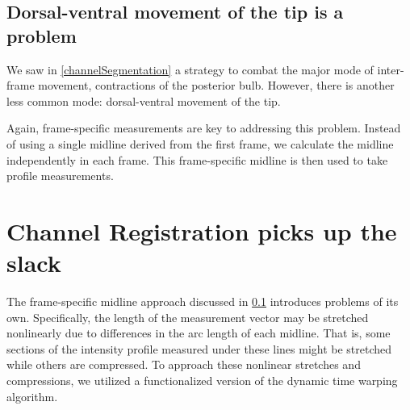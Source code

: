 \subsection{Dorsal-ventral movement of the tip is a problem} \label{frameSpecificMidlines}
We saw in \ref{channelSegmentation} a strategy to combat the major mode of inter-frame movement, contractions of the posterior bulb. However, there is another less common mode: dorsal-ventral movement of the tip. 


Again, frame-specific measurements are key to addressing this problem. Instead of using a single midline derived from the first frame, we calculate the midline independently in each frame. This frame-specific midline is then used to take profile measurements.

\section{Channel Registration picks up the slack}

The frame-specific midline approach discussed in \ref{frameSpecificMidlines} introduces problems of its own. Specifically, the length of the measurement vector may be stretched nonlinearly due to differences in the arc length of each midline. That is, some sections of the intensity profile measured under these lines might be stretched while others are compressed. To approach these nonlinear stretches and compressions, we utilized a functionalized version of the dynamic time warping algorithm.

